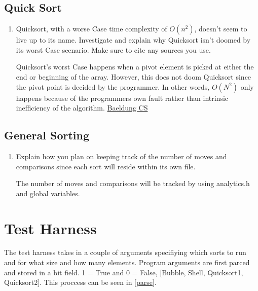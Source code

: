 \documentclass[12pt]{article}
\newenvironment{QandA}{\begin{enumerate}[label=\bfseries\alph*.]\bfseries}
{\end{enumerate}}
\newenvironment{answered}{\par\normalfont}{}
\begin{document}
    \subsection{Quick Sort}
    \begin{QandA}
    \item Quicksort, with a worse Case time complexity of $O(n^2)$, doesn’t seem to live up to its name. Investigate and explain why Quicksort isn’t doomed by its worst Case scenario. Make sure to cite any sources you use.
        \begin{answered}
            Quicksort's worst Case happens when a pivot element is picked at either the end or beginning of the array. However, this does not doom Quicksort since the pivot point is decided by the programmer. In other words, $O(N^2)$ only happens because of the programmers own fault rather than intrinsic inefficiency of the algorithm. \href{https://www.baeldung.com/cs/quicksort-time-complexity-worst-Case}{Baeldung CS}
        \end{answered}


    \end{QandA}

    \subsection{General Sorting}
    \begin{QandA}
    \item Explain how you plan on keeping track of the number of moves and comparisons since each sort will reside within its own file.
        \begin{answered}
            The number of moves and comparisons will be tracked by using analytics.h and global variables.
        \end{answered}


    \end{QandA}


    \section{Test Harness}

	The test harness takes in a couple of arguments specifiying which sorts to run and for what size and how many elements. Program arguments are first parced and stored in a bit field. 1 = True and 0 = False, [Bubble, Shell, Quicksort1, Quicksort2]. This proccess can be seen in \vref{parse}.
\end{document}

